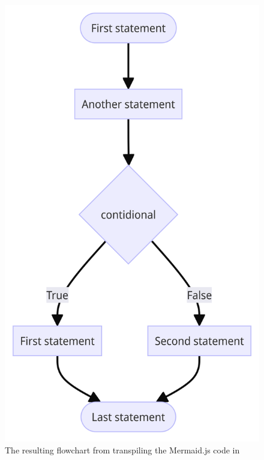 \begin{figure}[ht]
    \centering
    \includegraphics[scale=.07]{assets/chapter3/MermaidProgram.png}
    \caption{The resulting flowchart from transpiling the Mermaid.js code in }
    \label{A mermaid.js flowchart.}
\end{figure}
